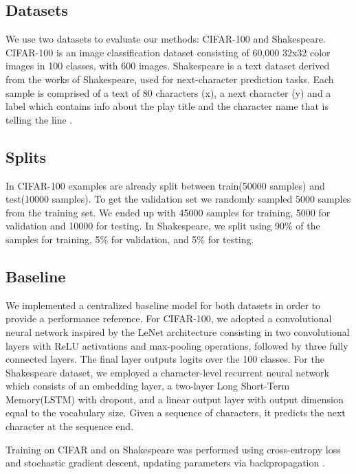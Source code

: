 \documentclass[10pt,twocolumn,letterpaper]{article}
\begin{document}
\subsection{Datasets}
We use two datasets to evaluate our methods: CIFAR-100 and Shakespeare.
CIFAR-100 \cite{Cifar} is an image classification dataset consisting of 60,000 32x32 color images in 100 classes, with 600 images.
Shakespeare \cite{Shakespeare} is a text dataset derived from the works of Shakespeare, used for next-character prediction tasks. Each sample is comprised of a text of 80 characters (x), a next character (y) and a label which contains info about the play title and the character name that is telling the line .
\subsection{Splits}
In CIFAR-100 examples are already split between train(50000 samples) and test(10000 samples). To get the validation set we randomly sampled 5000 samples from the training set.
 We ended up with 45000 samples for training, 5000 for validation and 10000 for testing.
In Shakespeare, we split using 90\% of the samples for training, 5\% for validation, and 5\% for testing.  
\subsection{Baseline}
We implemented a centralized baseline model for both datasets in order to provide a performance
 reference. 
For CIFAR-100, we adopted a convolutional neural network inspired by the LeNet architecture consisting in two convolutional layers with ReLU activations and max-pooling operations,
 followed by three fully connected layers. The final layer outputs logits over the 100 classes.
For the Shakespeare dataset, we employed a character-level recurrent neural network which consists of an embedding layer, a two-layer Long Short-Term Memory(LSTM) with dropout, and a linear output layer with output dimension equal to the vocabulary size. Given a sequence of characters, it predicts the next character at the sequence end.

 Training on CIFAR  and on Shakespeare was performed using cross-entropy loss and stochastic gradient descent,
updating parameters via backpropagation .
\end{document}
